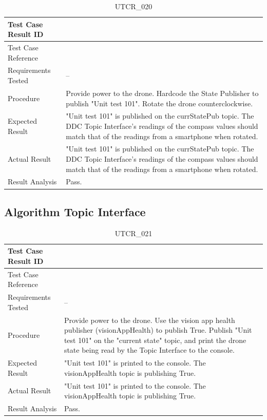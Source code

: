\documentclass[12pt, titlepage]{article}
\begin{document}
\begin{table}[!h]
\begin{center}
\caption {UTCR\_020}
\label{tab:UTCR_020}
\begin{tabular}{ | m{3.2cm} | m{12.2cm} | } 
\hline
Test Case Result ID & \nameref{tab:UTCR_020} \\ 
\hline
Test Case Reference & \nameref{tab:UTC_020}  \\ 
\hline
Requirements Tested & -- \\ 
\hline
Procedure & Provide power to the drone. Hardcode the State Publisher to publish "Unit test 101". Rotate the drone counterclockwise. \\ 
\hline
Expected Result & "Unit test 101" is published on the currStatePub topic. The DDC Topic Interface's readings of the compass values should match that of the readings from a smartphone when rotated. \\
\hline
Actual Result & "Unit test 101" is published on the currStatePub topic. The DDC Topic Interface's readings of the compass values should match that of the readings from a smartphone when rotated. \\
\hline
Result Analysis & Pass. \\ 
\hline
\end{tabular}
\end{center}
\end{table}

\clearpage

\subsection{Algorithm Topic Interface}
\label{subsec:algoTopicInterface}

\begin{table}[!h]
\begin{center}
\caption {UTCR\_021}
\label{tab:UTCR_021}
\begin{tabular}{ | m{3.2cm} | m{12.2cm} | } 
\hline
Test Case Result ID & \nameref{tab:UTCR_021} \\ 
\hline
Test Case Reference & \nameref{tab:UTC_021}  \\ 
\hline
Requirements Tested & -- \\ 
\hline
Procedure & Provide power to the drone. Use the vision app health publisher (visionAppHealth) to publish True. Publish "Unit test 101" on the "current state" topic, and print the drone state being read by the Topic Interface to the console. \\ 
\hline
Expected Result & "Unit test 101" is printed to the console. The visionAppHealth topic is publishing True. \\
\hline
Actual Result & "Unit test 101" is printed to the console. The visionAppHealth topic is publishing True. \\
\hline
Result Analysis & Pass. \\ 
\hline
\end{tabular}
\end{center}
\end{table}
\end{document}
